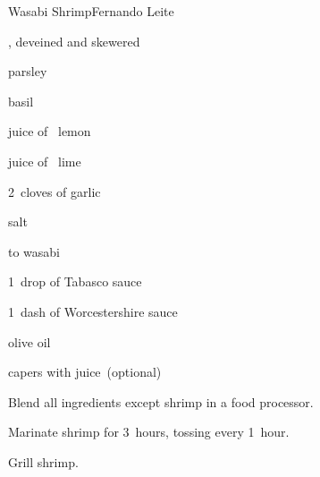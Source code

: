 \begin{recipe}{Wasabi Shrimp}{Fernando Leite}{}

\begin{ingredients}
\item {}, deveined and skewered
\item parsley
\item basil
\item juice of \quarter~lemon
\item juice of \quarter~lime
\item 2~cloves of garlic
\item salt
\item \half to  wasabi
\item 1~drop of Tabasco sauce
\item 1~dash of Worcestershire sauce
\item olive oil
\item capers with juice~(optional)
\end{ingredients}

\begin{directions}
\item Blend all ingredients except shrimp in a food processor.
\item Marinate shrimp for 3~hours, tossing every 1~hour.
\item Grill shrimp.
\end{directions}

\end{recipe}
